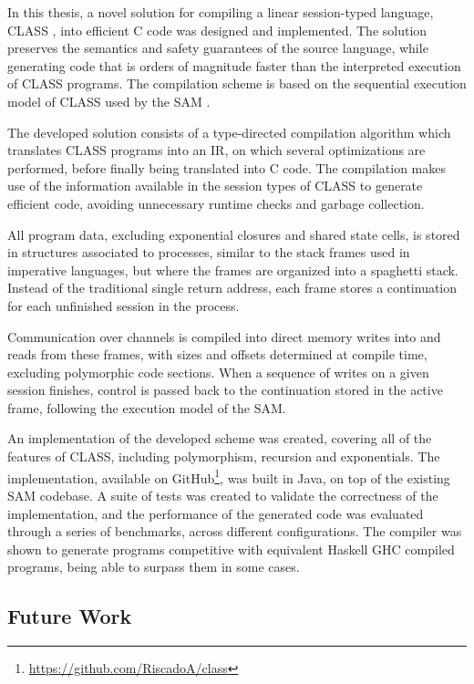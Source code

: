\documentclass[sigconf,nonacm,natbib=true]{acmart}
\begin{document}
In this thesis, a novel solution for compiling a linear session-typed language, \ac{CLASS} \cite{Rocha:2023}, into efficient C code was designed and implemented. The solution preserves the semantics and safety guarantees of the source language, while generating code that is orders of magnitude faster than the interpreted execution of \ac{CLASS} programs. The compilation scheme is based on the sequential execution model of \ac{CLASS} used by the \acf{SAM} \cite{Caires:2024}.

The developed solution consists of a type-directed compilation algorithm which translates \ac{CLASS} programs into an \acf{IR}, on which several optimizations are performed, before finally being translated into C code. The compilation makes use of the information available in the session types of \ac{CLASS} to generate efficient code, avoiding unnecessary runtime checks and garbage collection.

All program data, excluding exponential closures and shared state cells, is stored in structures associated to processes, similar to the stack frames used in imperative languages, but where the frames are organized into a spaghetti stack. Instead of the traditional single return address, each frame stores a continuation for each unfinished session in the process.

Communication over channels is compiled into direct memory writes into and reads from these frames, with sizes and offsets determined at compile time, excluding polymorphic code sections. When a sequence of writes on a given session finishes, control is passed back to the continuation stored in the active frame, following the execution model of the \ac{SAM}.

An implementation of the developed scheme was created, covering all of the features of \ac{CLASS}, including polymorphism, recursion and exponentials. The implementation, available on GitHub\footnote{\url{https://github.com/RiscadoA/class}}, was built in Java, on top of the existing \ac{SAM} codebase. A suite of tests was created to validate the correctness of the implementation, and the performance of the generated code was evaluated through a series of benchmarks, across different configurations. The compiler was shown to generate programs competitive with equivalent Haskell GHC compiled programs, being able to surpass them in some cases.

\subsection{Future Work}
\end{document}
